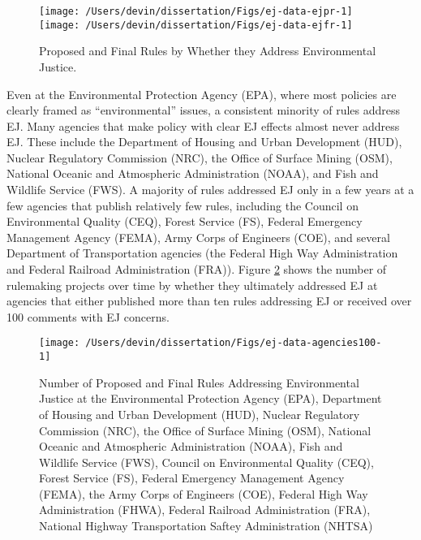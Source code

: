 \documentclass[
      12pt,
        ]{article}
\begin{document}
\begin{figure}

{\centering \texttt{[image: /Users/devin/dissertation/Figs/ej-data-ejpr-1]} \texttt{[image: /Users/devin/dissertation/Figs/ej-data-ejfr-1]} 

}

\caption{Proposed and Final Rules by Whether they Address Environmental Justice.}\label{fig:ej-data}
\end{figure}

Even at the Environmental Protection Agency (EPA), where most policies are clearly framed as ``environmental'' issues, a consistent minority of rules address EJ. Many agencies that make policy with clear EJ effects almost never address EJ. These include the Department of Housing and Urban Development (HUD), Nuclear Regulatory Commission (NRC), the Office of Surface Mining (OSM), National Oceanic and Atmospheric Administration (NOAA), and Fish and Wildlife Service (FWS). A majority of rules addressed EJ only in a few years at a few agencies that publish relatively few rules, including the Council on Environmental Quality (CEQ), Forest Service (FS), Federal Emergency Management Agency (FEMA), Army Corps of Engineers (COE), and several Department of Transportation agencies (the Federal High Way Administration and Federal Railroad Administration (FRA)). Figure \ref{fig:ej-data-agencies100} shows the number of rulemaking projects over time by whether they ultimately addressed EJ at agencies that either published more than ten rules addressing EJ or received over 100 comments with EJ concerns.

\begin{figure}

{\centering \texttt{[image: /Users/devin/dissertation/Figs/ej-data-agencies100-1]} 

}

\caption{Number of Proposed and Final Rules Addressing Environmental Justice at the Environmental Protection Agency (EPA), Department of Housing and Urban Development (HUD), Nuclear Regulatory Commission (NRC), the Office of Surface Mining (OSM), National Oceanic and Atmospheric Administration (NOAA), Fish and Wildlife Service (FWS), Council on Environmental Quality (CEQ), Forest Service (FS), Federal Emergency Management Agency (FEMA), the Army Corps of Engineers (COE), Federal High Way Administration (FHWA), Federal Railroad Administration (FRA), National Highway Transportation Saftey Administration (NHTSA)}\label{fig:ej-data-agencies100}
\end{figure}
\end{document}
